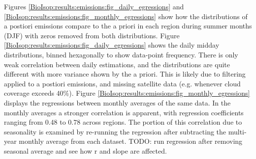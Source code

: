     Figures \ref{BioIsop:results:emissions:fig_daily_egressions} and \ref{BioIsop:results:emissions:fig_monthly_egressions} show how the distributions of a postiori emissions compare to the a priori in each region during summer months (DJF) with zeros removed from both distributions. %
    Figure \ref{BioIsop:results:emissions:fig_daily_egressions} shows the daily midday distributions, binned hexagonally to show data-point frequency.
    There is only weak correlation between daily estimations, and the distributions are quite different with more variance shown by the a priori.
    This is likely due to filtering applied to a postiori emissions, and missing satellite data (e.g. whenever cloud coverage exceeds 40\%).
    Figure \ref{BioIsop:results:emissions:fig_monthly_egressions} displays the regressions between monthly averages of the same data. 
    In the monthly averages a stronger correlation is apparent, with regression coefficients ranging from 0.48 to 0.78 across regions.
    The portion of this correlation due to seasonality is examined by re-running the regression after subtracting the multi-year monthly average from each dataset.
    TODO: run regression after removing seasonal average and see how r and slope are affected.
    
    
    
